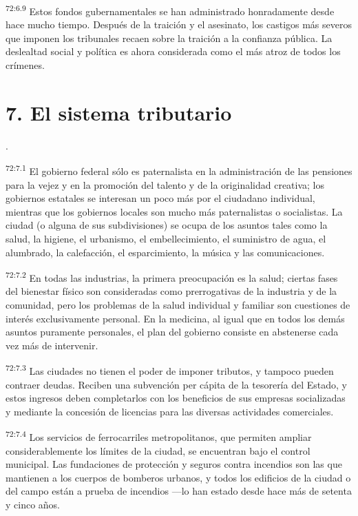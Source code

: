 \par
\textsuperscript{72:6.9} Estos fondos gubernamentales se han administrado honradamente desde hace mucho tiempo. Después de la traición y el asesinato, los castigos más severos que imponen los tribunales recaen sobre la traición a la confianza pública. La deslealtad social y política es ahora considerada como el más atroz de todos los crímenes.

\section*{7. El sistema tributario}.
\par
\textsuperscript{72:7.1} El gobierno federal sólo es paternalista en la administración de las pensiones para la vejez y en la promoción del talento y de la originalidad creativa; los gobiernos estatales se interesan un poco más por el ciudadano individual, mientras que los gobiernos locales son mucho más paternalistas o socialistas. La ciudad (o alguna de sus subdivisiones) se ocupa de los asuntos tales como la salud, la higiene, el urbanismo, el embellecimiento, el suministro de agua, el alumbrado, la calefacción, el esparcimiento, la música y las comunicaciones.

\par
\textsuperscript{72:7.2} En todas las industrias, la primera preocupación es la salud; ciertas fases del bienestar físico son consideradas como prerrogativas de la industria y de la comunidad, pero los problemas de la salud individual y familiar son cuestiones de interés exclusivamente personal. En la medicina, al igual que en todos los demás asuntos puramente personales, el plan del gobierno consiste en abstenerse cada vez más de intervenir.

\par
\textsuperscript{72:7.3} Las ciudades no tienen el poder de imponer tributos, y tampoco pueden contraer deudas. Reciben una subvención per cápita de la tesorería del Estado, y estos ingresos deben completarlos con los beneficios de sus empresas socializadas y mediante la concesión de licencias para las diversas actividades comerciales.

\par
\textsuperscript{72:7.4} Los servicios de ferrocarriles metropolitanos, que permiten ampliar considerablemente los límites de la ciudad, se encuentran bajo el control municipal. Las fundaciones de protección y seguros contra incendios son las que mantienen a los cuerpos de bomberos urbanos, y todos los edificios de la ciudad o del campo están a prueba de incendios ---lo han estado desde hace más de setenta y cinco años.

